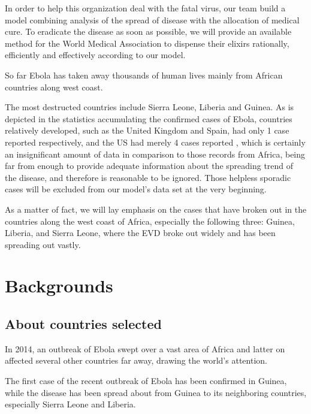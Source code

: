 \documentclass[11pt]{article}
\begin{document}
In order to help this organization deal with the fatal virus, our team build a model combining analysis of the spread of disease with the allocation of medical cure. To eradicate the disease as soon as possible, we will provide an available method for the World Medical Association to dispense their elixirs rationally, efficiently and effectively according to our model.



So far Ebola has taken away thousands of human lives mainly from African countries along west coast.

The most destructed countries include Sierra Leone, Liberia and Guinea. As is depicted in the statistics accumulating the confirmed cases of Ebola, countries relatively developed, such as the United Kingdom and Spain, had only 1 case reported respectively, and the US had merely 4 cases reported \cite{NumOfCases}, which is certainly an insignificant amount of data in comparison to those records from Africa, being far from enough to provide adequate information about the spreading trend of the disease, and therefore is reasonable to be ignored. Those helpless sporadic cases will be excluded from our model's data set at the very beginning.

As a matter of fact, we will lay emphasis on the cases that have broken out in the countries along the west coast of Africa, especially the following three: Guinea, Liberia, and Sierra Leone, where the EVD broke out widely and has been spreading out vastly. 



\section{Backgrounds}

\subsection{About countries selected}%

In 2014, an outbreak of Ebola swept over a vast area of Africa and latter on affected several other countries far away, drawing the world's attention.

The first case of the recent outbreak of Ebola has been confirmed in Guinea, while the disease has been spread about from Guinea to its neighboring countries, especially Sierra Leone and Liberia. 
\end{document}
